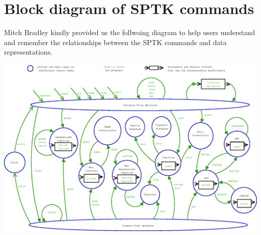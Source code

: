 \chapter{Block diagram of SPTK commands}%

Mitch Bradley kindly provided us the follwoing diagram to help users understand
and remember the relationships between the SPTK commands and data representations.

\vspace{1.0cm} 

\includegraphics[width=16.5cm]{fig/sptk_sigproc.eps} 
